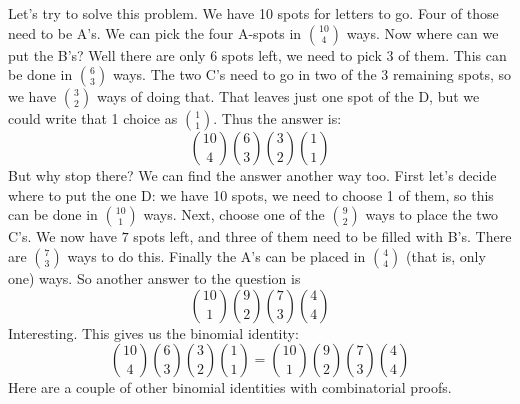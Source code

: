 \documentclass[12pt]{article}
\begin{document}
Let's try to solve this problem.  We have 10 spots for letters to go.  Four of those need to be A's.  We can pick the four A-spots in ${10 \choose 4}$ ways.  Now where can we put the B's?  Well there are only 6 spots left, we need to pick $3$ of them.  This can be done in ${6 \choose 3}$ ways.  The two C's need to go in two of the 3 remaining spots, so we have ${3 \choose 2}$ ways of doing that.  That leaves just one spot of the D, but we could write that 1 choice as ${1 \choose 1}$.  Thus the answer is:
\[{10 \choose 4}{6 \choose 3}{3 \choose 2}{1 \choose 1}\]
But why stop there?  We can find the answer another way too.  First let's decide where to put the one D: we have 10 spots, we need to choose 1 of them, so this can be done in ${10 \choose 1}$ ways.  Next, choose one of the ${9 \choose 2}$ ways to place the two C's.  We now have $7$ spots left, and three of them need to be filled with B's.  There are ${7 \choose 3}$ ways to do this.  Finally the A's can be placed in ${4 \choose 4}$ (that is, only one) ways.  So another answer to the question is
\[{10 \choose 1}{9 \choose 2}{7 \choose 3}{4 \choose 4}\]
Interesting.  This gives us the binomial identity:
\[{10 \choose 4}{6 \choose 3}{3 \choose 2}{1 \choose 1} = {10 \choose 1}{9 \choose 2}{7 \choose 3}{4 \choose 4}\]
Here are a couple of other binomial identities with combinatorial proofs.
\end{document}
